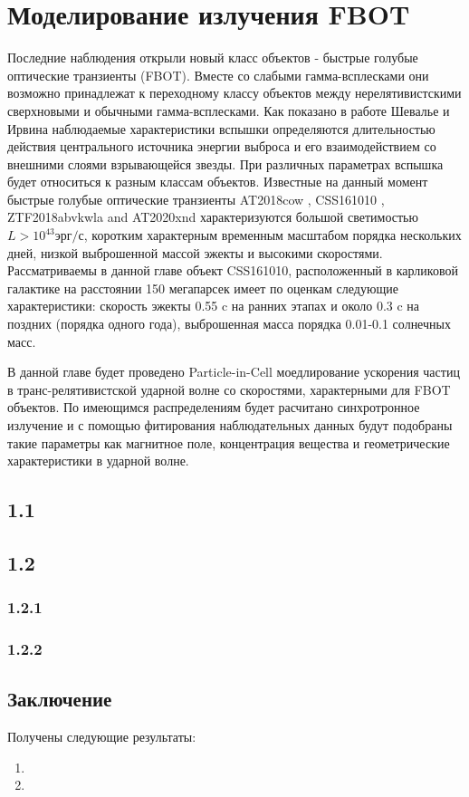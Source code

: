 \chapter{Моделирование излучения FBOT}\label{FBOT}

Последние наблюдения открыли новый класс объектов - быстрые голубые оптические транзиенты (FBOT)\cite{Drout2014, Margutti2014, Coppejans2020, Ho2020}. Вместе со слабыми гамма-всплесками они возможно принадлежат к переходному классу объектов между нерелятивистскими сверхновыми и обычными гамма-всплесками. Как показано в работе Шевалье и Ирвина \cite{Chevalier2011} наблюдаемые характеристики вспышки определяются длительностью действия центрального источника энергии выброса и его взаимодействием со внешними слоями взрывающейся звезды. При различных параметрах вспышка будет относиться к разным классам объектов. Известные на данный момент быстрые голубые оптические транзиенты AT2018cow \cite{Margutti2014}, CSS161010 \cite{Coppejans2020}, ZTF2018abvkwla \cite{Ho2020} and AT2020xnd \cite{Ho2021, Bright2021} характеризуются большой светимостью $L > 10^43 эрг/с$, коротким характерным временным масштабом порядка нескольких дней, низкой выброшенной массой эжекты и высокими скоростями.
Рассматриваемы в данной главе объект CSS161010, расположенный в карликовой галактике на расстоянии 150 мегапарсек имеет по оценкам следующие\cite{Coppejans2020} характеристики: скорость эжекты 0.55 c на ранних этапах и около 0.3 c на поздних (порядка одного года), выброшенная масса порядка 0.01-0.1 солнечных масс. 


В данной главе будет проведено Particle-in-Cell моедлирование ускорения частиц в транс-релятивистской ударной волне со скоростями, характерными для FBOT объектов. По имеющимся распределениям будет расчитано синхротронное излучение и с помощью фитирования наблюдательных данных будут подобраны такие параметры как магнитное поле, концентрация вещества и геометрические характеристики в ударной волне.

\section{1.1}



\section{1.2}


\subsection{1.2.1}\label{sec:Bg_rate}




\subsection{1.2.2}




\FloatBarrier
\section{Заключение}
 

Получены следующие результаты:
\begin{enumerate}
\item 
\item 
\end{enumerate}


\clearpage